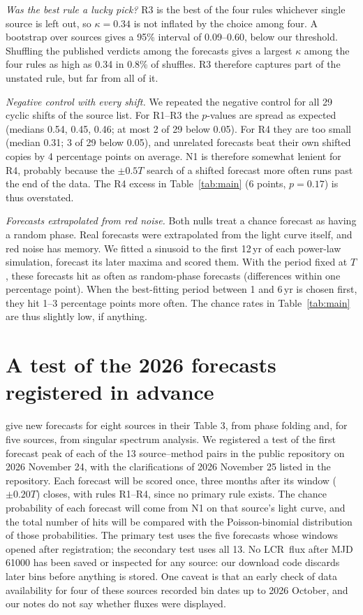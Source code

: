 \documentclass[twocolumn]{aastex631}
\newcommand{\LCR}{LCR}
\begin{document}
\textit{Was the best rule a lucky pick?} R3 is the best of the four rules whichever single source is left out, so $\kappa=0.34$ is not inflated by the choice among four. A bootstrap over sources gives a 95\% interval of 0.09--0.60, below our threshold. Shuffling the published verdicts among the forecasts gives a largest $\kappa$ among the four rules as high as 0.34 in 0.8\% of shuffles. R3 therefore captures part of the unstated rule, but far from all of it.

\textit{Negative control with every shift.} We repeated the negative control for all 29 cyclic shifts of the source list. For R1--R3 the $p$-values are spread as expected (medians 0.54, 0.45, 0.46; at most 2 of 29 below 0.05). For R4 they are too small (median 0.31; 3 of 29 below 0.05), and unrelated forecasts beat their own shifted copies by 4 percentage points on average. N1 is therefore somewhat lenient for R4, probably because the $\pm0.5T$ search of a shifted forecast more often runs past the end of the data. The R4 excess in Table~\ref{tab:main} (6 points, $p=0.17$) is thus overstated.

\textit{Forecasts extrapolated from red noise.} Both nulls treat a chance forecast as having a random phase. Real forecasts were extrapolated from the light curve itself, and red noise has memory. We fitted a sinusoid to the first 12\,yr of each power-law simulation, forecast its later maxima and scored them. With the period fixed at $T$, these forecasts hit as often as random-phase forecasts (differences within one percentage point). When the best-fitting period between 1 and 6\,yr is chosen first, they hit 1--3 percentage points more often. The chance rates in Table~\ref{tab:main} are thus slightly low, if anything.

\section{A test of the 2026 forecasts registered in advance} \label{sec:partc}

\citet{penil26} give new forecasts for eight sources in their Table 3, from phase folding and, for five sources, from singular spectrum analysis. We registered a test of the first forecast peak of each of the 13 source--method pairs in the public repository on 2026 November 24, with the clarifications of 2026 November 25 listed in the repository. Each forecast will be scored once, three months after its window ($\pm0.20T$) closes, with rules R1--R4, since no primary rule exists. The chance probability of each forecast will come from N1 on that source's light curve, and the total number of hits will be compared with the Poisson-binomial distribution of those probabilities. The primary test uses the five forecasts whose windows opened after registration; the secondary test uses all 13. No \LCR\ flux after MJD 61000 has been saved or inspected for any source: our download code discards later bins before anything is stored. One caveat is that an early check of data availability for four of these sources recorded bin dates up to 2026 October, and our notes do not say whether fluxes were displayed.
\end{document}
